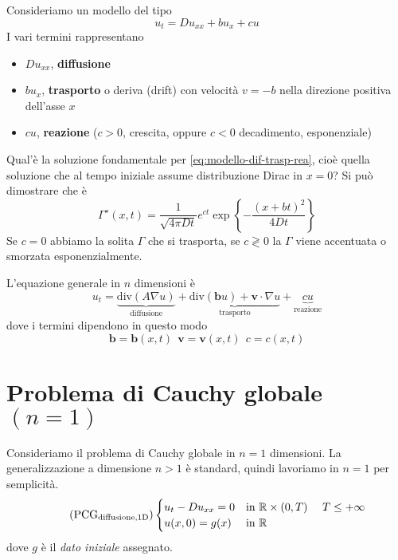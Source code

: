 \documentclass[10pt,a4paper,twoside,openright]{book}
\begin{document}
Consideriamo un modello del tipo
\begin{equation}
u_{t} =Du_{xx} +bu_{x} +cu
\label{eq:modello-dif-trasp-rea}
\end{equation}
I vari termini rappresentano
\begin{itemize}
\item $Du_{xx}$, \textbf{diffusione}
\item $bu_{x}$, \textbf{trasporto} o deriva (drift) con velocità $v=-b$ nella direzione positiva dell'asse $x$
\item $cu$, \textbf{reazione} ($c >0$, crescita, oppure $c< 0$ decadimento, esponenziale)
\end{itemize}

Qual'è la soluzione fondamentale per \eqref{eq:modello-dif-trasp-rea}, cioè quella soluzione che al tempo iniziale assume distribuzione Dirac in $x=0$? Si può dimostrare che è
\begin{equation}
\boxed{\Gamma ^{\star }(x,t) =\frac{1}{\sqrt{4\pi Dt}} e^{ct}\exp\left\{-\frac{(x+bt)^{2}}{4Dt}\right\}}
\end{equation}
Se $c=0$ abbiamo la solita $\Gamma $ che si trasporta, se $c\gtrless 0$ la $\Gamma $ viene accentuata o smorzata esponenzialmente.

L'equazione generale in $n$ dimensioni è
\begin{equation*}
u_{t} = \underbrace{\mathrm{div}(A \nabla u)}_{\text{diffusione}} + \underbrace{\mathrm{div}(\mathbf{b} u) +\mathbf{v} \cdot\nabla u}_{\text{trasporto}} + \underbrace{cu}_{\text{reazione}}
\end{equation*}
dove i termini dipendono in questo modo
\begin{equation*}
\mathbf{b} =\mathbf{b}(x,t) \ \ \mathbf{v} =\mathbf{v}(x,t) \ \ c=c(x,t)
\end{equation*}
\section{Problema di Cauchy globale \texorpdfstring{$(n=1)$}{n=1}}

Consideriamo il problema di Cauchy globale in $n=1$ dimensioni. La generalizzazione a dimensione $n >1$ è standard, quindi lavoriamo in $n=1$ per semplicità.
\begin{equation*}
	\tag{PCG$_{\text{diffusione,1D}}$}
	\begin{cases}
		u_{t} -Du_{xx} =0 & \text{in} \ \mathbb{R} \times (0,T) \ \ \ \ T\leqslant +\infty \\
		u(x,0) =g(x) & \text{in} \ \mathbb{R}
	\end{cases}
	\label{eq:pcg-calore-1d}
\end{equation*}
dove $g$ è il \textit{dato iniziale} assegnato.
\end{document}
